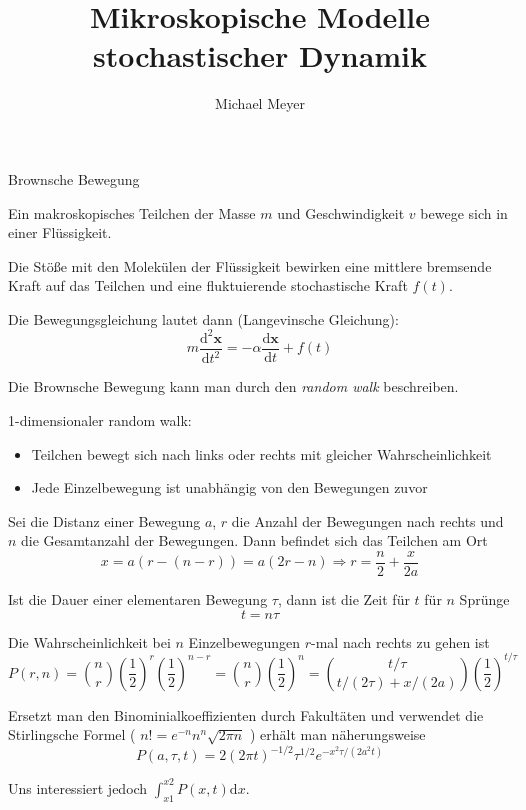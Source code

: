 \documentclass[ngerman]{article}
\title{Mikroskopische Modelle stochastischer Dynamik}
\date{}
\author{Michael Meyer}
\begin{document}
 \maketitle


\setlength\parindent{0pt}

\begin{section}{Brownsche Bewegung}


Ein makroskopisches Teilchen der Masse $m$ und Geschwindigkeit $v$ bewege sich in einer Flüssigkeit.
  
Die Stöße mit den Molekülen der Flüssigkeit bewirken eine mittlere bremsende Kraft auf das Teilchen und eine fluktuierende stochastische Kraft $f(t)$. 

Die Bewegungsgleichung lautet dann
(Langevinsche Gleichung):
   $$m\frac{\text{d}^{2}\mathbf{x}}{\text{d}t^{2}}=-\alpha \frac{\text{d}\mathbf{x}}{\text{d}t}  + f(t)$$
 

Die Brownsche Bewegung kann man  durch den \textit{ random walk} beschreiben.



 1-dimensionaler random walk:
\begin{itemize}
\item
Teilchen bewegt sich nach links oder rechts mit gleicher Wahrscheinlichkeit
\item
Jede Einzelbewegung ist unabhängig von den Bewegungen zuvor
\end{itemize}

Sei die Distanz einer Bewegung $a$, $r$ die Anzahl der Bewegungen nach rechts und $n$ die Gesamtanzahl der Bewegungen.
Dann befindet sich das Teilchen am Ort
$$x = a(r-(n-r))= a(2r-n) \Rightarrow r= \frac{n}{2}+\frac{x}{2a}$$

Ist die Dauer einer elementaren Bewegung $\tau$, dann ist die Zeit für $t$ für $n$ Sprünge $$t=n \tau$$

Die Wahrscheinlichkeit bei $n$ Einzelbewegungen $r$-mal nach rechts zu gehen ist 
$$ P(r, n)=\binom{n}{r} \left(  \frac{1}{2}\right)^r \left(  \frac{1}{2}\right)^{n-r}=\binom{n}{r}\left(  \frac{1}{2}\right)^n  = \binom{t / \tau}{t/ (2\tau) + x/(2a)} \left(  \frac{1}{2}\right)^{t/\tau}$$




Ersetzt man den Binominialkoeffizienten durch Fakultäten und verwendet die Stirlingsche Formel ( $n!=e^{-n}n^n\sqrt{2\pi n}$ ) erhält man näherungsweise
$$P(a, \tau, t)=2(2\pi t)^{-1/2}\tau^{1/2}e^{-x^2\tau/(2a^2t)}$$

Uns interessiert jedoch $\int_{x1}^{x2}P(x, t)\text{d}x$. 



\end{section}
\end{document}
